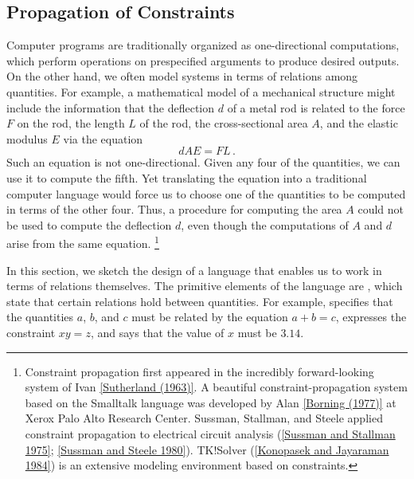 \subsection{Propagation of Constraints}
\label{Section 3.3.5}

Computer programs are traditionally organized as one-directional computations, which perform operations on prespecified arguments to produce desired outputs.
On the other hand, we often model systems in terms of relations among quantities.
For example, a mathematical model of a mechanical structure might include the information that the deflection \( d \) of a metal rod is related to the force \( F \) on the rod, the length \( L \) of the rod, the cross-sectional area \( A \), and the elastic modulus \( E \) via the equation
\[
	dAE = FL \,.
\]
Such an equation is not one-directional.
Given any four of the quantities, we can use it to compute the fifth.
Yet translating the equation into a traditional computer language would force us to choose one of the quantities to be computed in terms of the other four.
Thus, a procedure for computing the area \( A \) could not be used to compute the deflection \( d \), even though the computations of \( A \) and \( d \) arise from the same equation.%
\footnote{
	Constraint propagation first appeared in the incredibly forward-looking  system of Ivan \cref{Sutherland (1963)}.
	A beautiful constraint-propagation system based on the Smalltalk language was developed by Alan \cref{Borning (1977)} at Xerox Palo Alto Research Center.
	Sussman, Stallman, and Steele applied constraint propagation to electrical circuit analysis (\cref{Sussman and Stallman 1975}; \cref{Sussman and Steele 1980}).
	TK!Solver (\cref{Konopasek and Jayaraman 1984}) is an extensive modeling environment based on constraints.
}

In this section, we sketch the design of a language that enables us to work in terms of relations themselves.
The primitive elements of the language are , which state that certain relations hold between quantities.
For example,  specifies that the quantities \( a \), \( b \), and \( c \) must be related by the equation \( a + b = c \),  expresses the constraint \( xy = z \), and  says that the value of \( x \) must be \( 3.14 \).


